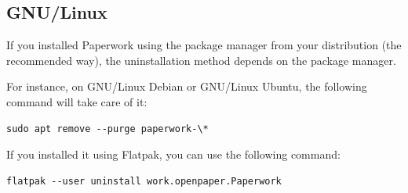 \documentclass[10pt,a4paper]{article}
\begin{document}
\subsection{GNU/Linux}

If you installed Paperwork using the package manager from your distribution
(the recommended way), the uninstallation method depends on the package
manager.

For instance, on GNU/Linux Debian or GNU/Linux Ubuntu, the following command
will take care of it:

\begin{verbatim}
sudo apt remove --purge paperwork-\*
\end{verbatim}

If you installed it using Flatpak, you can use the following command:

\begin{verbatim}
flatpak --user uninstall work.openpaper.Paperwork
\end{verbatim}
\end{document}

